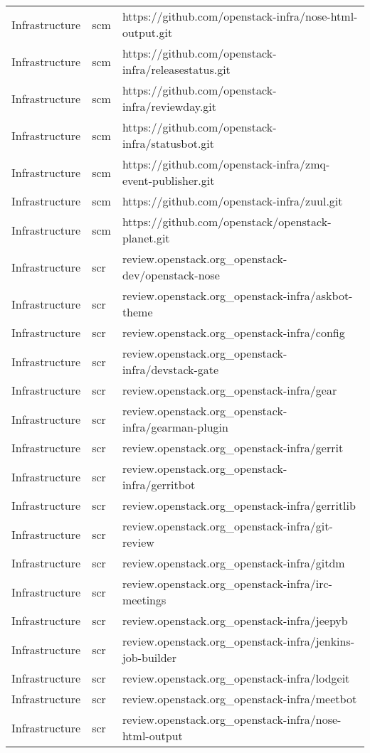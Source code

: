 \begin{center}
\begin{longtable}{|p{4cm}|p{1cm}|p{10cm}|}
Infrastructure&scm&https://github.com/openstack-infra/nose-html-output.git\\ 
Infrastructure&scm&https://github.com/openstack-infra/releasestatus.git\\ 
Infrastructure&scm&https://github.com/openstack-infra/reviewday.git\\ 
Infrastructure&scm&https://github.com/openstack-infra/statusbot.git\\ 
Infrastructure&scm&https://github.com/openstack-infra/zmq-event-publisher.git\\ 
Infrastructure&scm&https://github.com/openstack-infra/zuul.git\\ 
Infrastructure&scm&https://github.com/openstack/openstack-planet.git\\ 
Infrastructure&scr&review.openstack.org\_openstack-dev/openstack-nose\\ 
Infrastructure&scr&review.openstack.org\_openstack-infra/askbot-theme\\ 
Infrastructure&scr&review.openstack.org\_openstack-infra/config\\ 
Infrastructure&scr&review.openstack.org\_openstack-infra/devstack-gate\\ 
Infrastructure&scr&review.openstack.org\_openstack-infra/gear\\ 
Infrastructure&scr&review.openstack.org\_openstack-infra/gearman-plugin\\ 
Infrastructure&scr&review.openstack.org\_openstack-infra/gerrit\\ 
Infrastructure&scr&review.openstack.org\_openstack-infra/gerritbot\\ 
Infrastructure&scr&review.openstack.org\_openstack-infra/gerritlib\\ 
Infrastructure&scr&review.openstack.org\_openstack-infra/git-review\\ 
Infrastructure&scr&review.openstack.org\_openstack-infra/gitdm\\ 
Infrastructure&scr&review.openstack.org\_openstack-infra/irc-meetings\\ 
Infrastructure&scr&review.openstack.org\_openstack-infra/jeepyb\\ 
Infrastructure&scr&review.openstack.org\_openstack-infra/jenkins-job-builder\\ 
Infrastructure&scr&review.openstack.org\_openstack-infra/lodgeit\\ 
Infrastructure&scr&review.openstack.org\_openstack-infra/meetbot\\ 
Infrastructure&scr&review.openstack.org\_openstack-infra/nose-html-output\\ 

\end{longtable}
\end{center}
